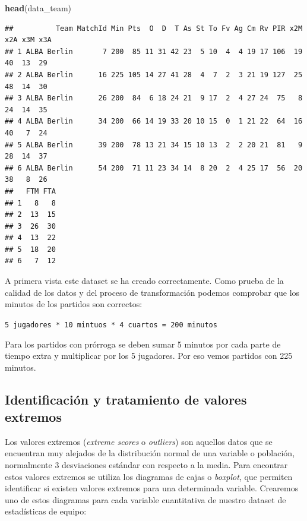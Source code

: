 \documentclass[
]{article}
\newenvironment{Shaded}{\begin{snugshade}}{\end{snugshade}}
\newcommand{\KeywordTok}[1]{\textcolor[rgb]{0.13,0.29,0.53}{\textbf{#1}}}
\newcommand{\NormalTok}[1]{#1}
\begin{document}
\begin{Shaded}
\begin{Highlighting}[]
\KeywordTok{head}\NormalTok{(data_team)}
\end{Highlighting}
\end{Shaded}

\begin{verbatim}
##          Team MatchId Min Pts  O  D  T As St To Fv Ag Cm Rv PIR x2M x2A x3M x3A
## 1 ALBA Berlin       7 200  85 11 31 42 23  5 10  4  4 19 17 106  19  40  13  29
## 2 ALBA Berlin      16 225 105 14 27 41 28  4  7  2  3 21 19 127  25  48  14  30
## 3 ALBA Berlin      26 200  84  6 18 24 21  9 17  2  4 27 24  75   8  24  14  35
## 4 ALBA Berlin      34 200  66 14 19 33 20 10 15  0  1 21 22  64  16  40   7  24
## 5 ALBA Berlin      39 200  78 13 21 34 15 10 13  2  2 20 21  81   9  28  14  37
## 6 ALBA Berlin      54 200  71 11 23 34 14  8 20  2  4 25 17  56  20  38   8  26
##   FTM FTA
## 1   8   8
## 2  13  15
## 3  26  30
## 4  13  22
## 5  18  20
## 6   7  12
\end{verbatim}

A primera vista este dataset se ha creado correctamente. Como prueba de
la calidad de los datos y del proceso de transformación podemos
comprobar que los minutos de los partidos son correctos:

\texttt{5\ jugadores\ *\ 10\ mintuos\ *\ 4\ cuartos\ =\ 200\ minutos}

Para los partidos con prórroga se deben sumar 5 minutos por cada parte
de tiempo extra y multiplicar por los 5 jugadores. Por eso vemos
partidos con 225 minutos.

\newpage

\hypertarget{identificaciuxf3n-y-tratamiento-de-valores-extremos}{%
\subsection{Identificación y tratamiento de valores
extremos}\label{identificaciuxf3n-y-tratamiento-de-valores-extremos}}

Los valores extremos (\emph{extreme scores} o \emph{outliers}) son
aquellos datos que se encuentran muy alejados de la distribución normal
de una variable o población, normalmente 3 desviaciones estándar con
respecto a la media. Para encontrar estos valores extremos se utiliza
los diagramas de cajas o \emph{boxplot}, que permiten identificar si
existen valores extremos para una determinada variable. Crearemos uno de
estos diagramas para cada variable cuantitativa de nuestro dataset de
estadísticas de equipo:
\end{document}
